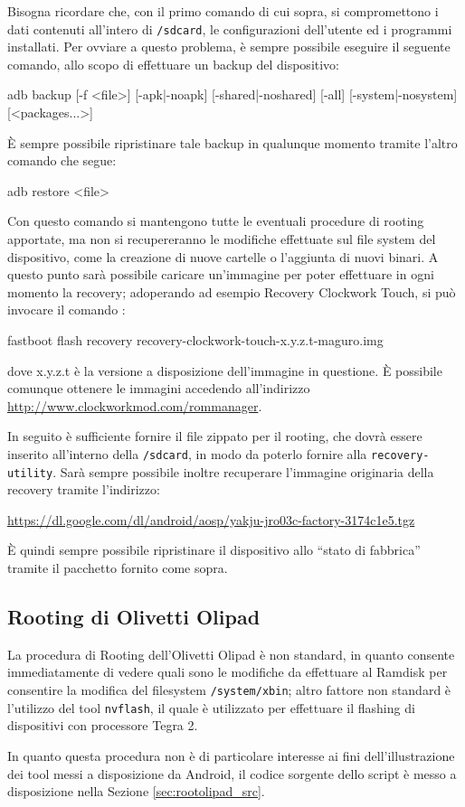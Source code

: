  Bisogna ricordare che, con il primo comando di cui sopra, si compromettono i dati contenuti all'intero di \texttt{\small /sdcard}, le configurazioni dell'utente ed i programmi installati. Per ovviare a questo problema, è sempre possibile eseguire il seguente comando, allo scopo di effettuare un backup del dispositivo:
\begin{bash}
adb backup [-f <file>] [-apk|-noapk] [-shared|-noshared] [-all] [-system|-nosystem] [<packages...>]
\end{bash}

 È sempre possibile ripristinare tale backup in qualunque momento tramite l'altro comando che segue:
\begin{bash} 
adb restore <file>
\end{bash}

 Con questo comando si mantengono tutte le eventuali procedure di rooting apportate, ma non si recupereranno le modifiche effettuate sul file system del dispositivo, come la creazione di nuove cartelle o l'aggiunta di nuovi binari.
 A questo punto sarà possibile caricare un'immagine per poter effettuare in ogni momento la recovery; adoperando ad esempio Recovery Clockwork Touch, si può invocare il comando : 
\begin{bash}
fastboot flash recovery recovery-clockwork-touch-x.y.z.t-maguro.img
\end{bash}
 dove x.y.z.t è la versione a disposizione dell'immagine in questione. È possibile comunque ottenere le immagini accedendo all'indirizzo {\small \url{http://www.clockworkmod.com/rommanager}}. 
 
 In seguito è sufficiente fornire il file zippato per il rooting, che dovrà essere inserito all'interno della \texttt{\small /sdcard}, in modo da poterlo fornire alla \texttt{recovery-utility}. Sarà sempre possibile inoltre recuperare l'immagine originaria della recovery tramite l'indirizzo:
\begin{center}
{\small \url{https://dl.google.com/dl/android/aosp/yakju-jro03c-factory-3174c1e5.tgz}}
\end{center}
 È quindi sempre possibile ripristinare il dispositivo allo ``stato di fabbrica'' tramite il pacchetto fornito come sopra.
 
\subsection{Rooting di Olivetti Olipad}\label{subsec:rootingoli}
La procedura di Rooting dell'Olivetti Olipad è non standard, in quanto consente immediatamente di vedere quali sono le modifiche da effettuare al Ramdisk per consentire la modifica del filesystem \texttt{\small /system/xbin}; altro fattore non standard è l'utilizzo del tool \texttt{nvflash}, il quale è utilizzato per effettuare il flashing di dispositivi con processore Tegra 2.

In quanto questa procedura non è di particolare interesse ai fini dell'illustrazione dei tool messi a disposizione da Android, il codice sorgente dello script è messo a disposizione nella Sezione \vref{sec:rootolipad_src}.


